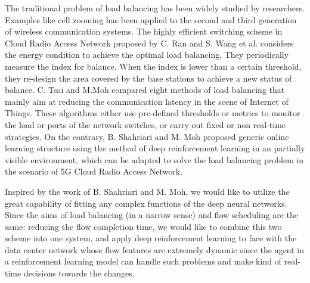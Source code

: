 \begin{bigabstract}
The traditional problem of load balancing has been widely studied by researchers. Examples like cell zooming has been applied to the second and third generation of wireless communication systems. The highly efficient switching scheme in Cloud Radio Access Network proposed by C. Ran and S. Wang et al. considers the energy condition to achieve the optimal load balancing. They periodically measure the index for balance. When the index is lower than a certain threshold, they re-design the area covered by the base stations to achieve a new status of balance. C. Tsai and M.Moh compared eight methods of load balancing that mainly aim at reducing the communication latency in the scene of Internet of Things. These algorithms either use pre-defined thresholds or metrics to monitor the load or ports of the network switches, or carry out fixed or non real-time strategies. On the contrary, B. Shahriari and M. Moh proposed generic online learning structure using the method of deep reinforcement learning in an partially visible environment, which can be adapted to solve the load balancing problem in the scenario of 5G Cloud Radio Access Network.

Inspired by the work of B. Shahriari and M. Moh, we would like to utilize the great capability of fitting any complex functions of the deep neural networks. Since the aims of load balancing (in a narrow sense) and flow scheduling are the same: reducing the flow completion time, we would like to combine this two scheme into one system, and apply deep reinforcement learning to face with the data center network whose flow features are extremely dynamic since the agent in a reinforcement learning model can handle such problems and make kind of real-time decisions towards the changes.


\end{bigabstract}
